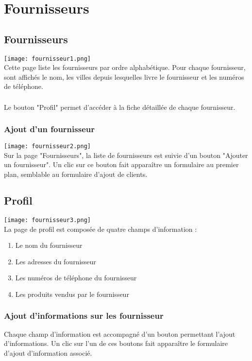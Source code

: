 \chapter{Fournisseurs}

\section{Fournisseurs}
\texttt{[image: fournisseur1.png]}\\
Cette page liste les fournisseurs par ordre alphabétique. Pour chaque fournisseur, sont
affichés le nom, les villes depuis lesquelles livre le fournisseur et
les numéros de téléphone.

\paragraph{}
Le bouton "Profil" permet d'accéder à la fiche détaillée de chaque fournisseur.

\subsection{Ajout d'un fournisseur}
\texttt{[image: fournisseur2.png]}\\
Sur la page "Fournisseurs", la liste de fournisseurs est suivie d'un bouton
"Ajouter un fournisseur". Un clic sur ce bouton fait apparaître un formulaire au
premier plan, semblable au formulaire d'ajout de clients.

\section{Profil}
\texttt{[image: fournisseur3.png]}\\
La page de profil est composée de quatre champs d'information :

\begin{enumerate}
  \item Le nom du fournisseur
  \item Les adresses du fournisseur
  \item Les numéros de téléphone du fournisseur
  \item Les produits vendus par le fournisseur
\end{enumerate}

\subsection{Ajout d'informations sur les fournisseur}
Chaque champ d'information est accompagné d'un bouton permettant l'ajout d'informations.
Un clic sur l'un de ces boutons fait apparaître le formulaire d'ajout
d'information associé.

